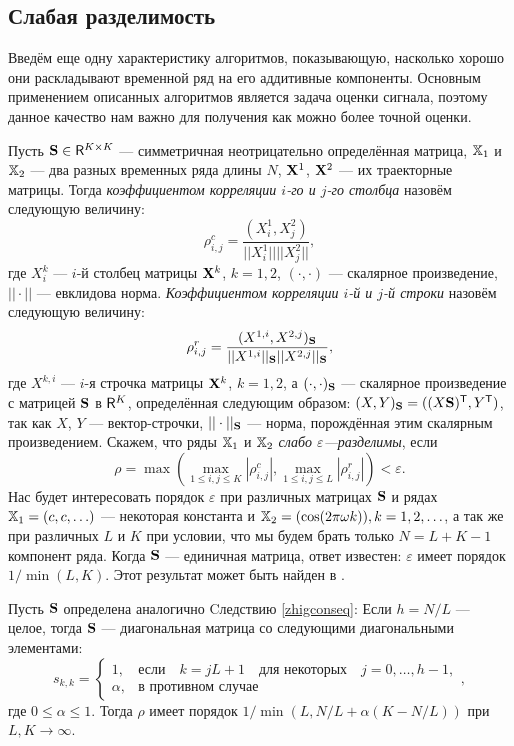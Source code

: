 \documentclass[12pt,a4paper,fleqn,leqno]{article}
\begin{document}
\subsection{Слабая разделимость}\label{weak_separ}
Введём еще одну характеристику алгоритмов, показывающую, насколько хорошо они раскладывают временной ряд на его аддитивные компоненты. Основным применением описанных алгоритмов является задача оценки сигнала, поэтому данное качество нам важно для получения как можно более точной оценки.

Пусть $\mathbf{S} \in \mathsf{R}^{K \times K}$ --- симметричная неотрицательно определённая матрица, $\mathbb{X}_1$ и $\mathbb{X}_2$ ---  два разных временных ряда длины $N$, $\mathbf{X}^1$, $\mathbf{X}^2$ --- их траекторные матрицы. Тогда \emph{коэффициентом корреляции $i$-го и $j$-го столбца} назовём следующую величину:
\begin{equation}\label{col_corr}
\rho^c_{i,j} = \frac{(X^1_i, X^2_j)}{||X^1_i|| ||X^2_j||},
\end{equation}
где $X^k_i$ --- $i$-й столбец матрицы $\mathbf{X}^k$, $k = 1, 2$, $(\cdot, \cdot)$ --- скалярное произведение, $||\cdot||$ --- евклидова норма. \emph{Коэффициентом корреляции $i$-й и $j$-й строки} назовём следующую величину:
\begin{equation}\label{row_corr}
\rho^r_{i,j} = \frac{(X^{1,i}, X^{2,j})_{\mathbf{S}}}{||X^{1,i}||_{\mathbf{S}} ||X^{2,j}||_{\mathbf{S}}},
\end{equation}
где $X^{k,i}$ --- $i$-я строчка матрицы $\mathbf{X}^k$, $k = 1, 2$, а $(\cdot, \cdot)_{\mathbf{S}}$ --- скалярное произведение с матрицей $\mathbf{S}$ в $\mathsf{R}^K$, определённая следующим образом: $(X, Y)_{\mathbf{S}} = ((X\mathbf{S})^{\mathsf{T}}, Y^{\mathsf{T}})$, так как $X$, $Y$ --- вектор-строчки, $|| \cdot ||_{\mathbf{S}}$ --- норма, порождённая этим скалярным произведением. Скажем, что ряды $\mathbb{X}_1$ и $\mathbb{X}_2$ \emph{слабо $\varepsilon$---разделимы}, если
\begin{equation}\label{weak_sep_eq}
\rho = \max(\max_{1 \le i,j \le K}|\rho^c_{i,j}|, \max_{1 \le i,j \le L}|\rho^r_{i,j}|) < \varepsilon.
\end{equation}
Нас будет интересовать порядок $\varepsilon$ при различных матрицах $\mathbf{S}$ и рядах $\mathbb{X}_1 = (c, c, \ldots)$ --- некоторая константа и $\mathbb{X}_2 = (\cos(2 \pi \omega k)), k = 1, 2, \ldots$, а так же при различных $L$ и $K$ при условии, что мы будем брать только $N = L + K - 1$ компонент ряда. Когда $\mathbf{S}$ --- единичная матрица, ответ известен: $\varepsilon$ имеет порядок $1/\min(L,K)$. Этот результат может быть найден в \cite{Golyandina.etal2001}.
\begin{lemma}
Пусть $\mathbf{S}$ определена аналогично Cледствию \ref{zhigconseq}:  Если $h = N/L$ --- целое, тогда  $\mathbf{S}$ --- диагональная матрица со следующими диагональными элементами:
\begin{equation*}
s_{k,k} = \begin{cases}
1, & \text{если} \quad k = jL+1 \quad \text{для некоторых} \quad j = 0, \ldots, h-1, \\
\alpha, & \text{в противном случае}
\end{cases},
\end{equation*}
где $0 \le \alpha \le 1$. Тогда $\rho$ имеет порядок $1/\min(L, N/L+\alpha(K - N/L))$ при $L, K \to \infty$.
\end{lemma}
\end{document}
